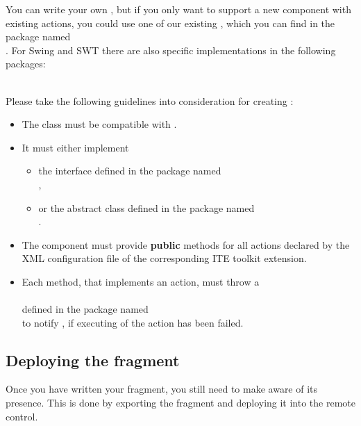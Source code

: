 You can write your own \gdtesterclasses, but if you only want to support a new
component with existing actions, you could use one of our existing
\gdtesterclasses, which you can find in the package named\\
. For Swing and SWT there are also
specific implementations in the following packages:\\
\\

Please take the following guidelines into consideration for creating
\gdtesterclasses:
\begin{itemize}
  \item The class must be compatible with .
  \item It must either implement
  \begin{itemize}
    \item the interface  defined in the package named\\
        ,\\
	 \item or the abstract class 
	     defined in the package named\\
	     .
  \end{itemize}
  \item The component must provide \textbf{public} methods for all actions
        declared by the XML configuration file of the corresponding ITE
        toolkit extension.
  \item Each method, that implements an action, must throw a\\
        \\
        defined in the package named\\
        to notify \app{}, if executing of the action has been failed.
\end{itemize}

\subsection{Deploying the fragment}

Once you have written your fragment, you still need to make \app{}
aware of its presence. This is done by exporting the fragment and
deploying it into the \app{} remote control.

